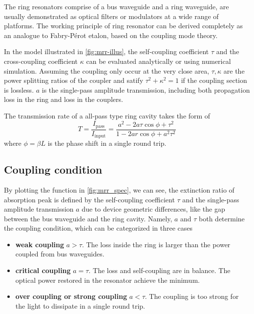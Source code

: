 The ring resonators comprise of a bus waveguide and a ring waveguide, are usually demonstrated as optical filters or modulators at a wide range of platforms. The working principle of ring resonator can be derived completely \cite{Bogaerts2012} as an analogue to Fabry-P\'{e}rot etalon, based on the coupling mode theory. 

\begin{figure}
    \centering
	
    \label{fig:mrr-illus}
\end{figure}

In the model illustrated in \autoref{fig:mrr-illus}, the self-coupling coefficient $\tau$ and the cross-coupling coefficient $\kappa$ can be evaluated analytically or using numerical simulation. Assuming the coupling only occur at the very close area, $\tau,\kappa$ are the power splitting ratios of the coupler and satify $\tau^2 + \kappa^2 =1 $ if the coupling section is lossless. $a$ is the single-pass amplitude transmission, including both propagation loss in the ring and loss in the couplers.

\begin{figure}
    \centering
    
    \label{fig:mrr_spec}
\end{figure}

The transmission rate of a all-pass type ring cavity takes the form of
\begin{equation}\label{eq:trans_phi}
    T = \frac{I_\mathrm{pass}}{I_\mathrm{input}} = \frac{a^2 - 2a\tau \cos \phi + \tau^2}{1 - 2ar \cos \phi + a^2 \tau^2}
\end{equation}
where $\phi=\beta L$ is the phase shift in a single round trip. 

\subsection{Coupling condition}

By plotting the function in \autoref{fig:mrr_spec}, we can see, the extinction ratio of absorption peak is defined by the self-coupling coefficient $\tau$ and the single-pass amplitude transmission $a$ due to device geometric differences, like the gap between the bus waveguide and the ring cavity. Namely, $a$ and $\tau$ both determine the coupling condition, which can be categorized in three cases
\begin{itemize}
    \item \textbf{weak coupling} $a>\tau$. The loss inside the ring is larger than the power coupled from bus waveguides.
    \item \textbf{critical coupling} $a=\tau$. The loss and self-coupling are in balance. The optical power restored in the resonator achieve the minimum.
    \item \textbf{over coupling or strong coupling} $a<\tau$. The coupling is too strong for the light to dissipate in a single round trip.
\end{itemize}

